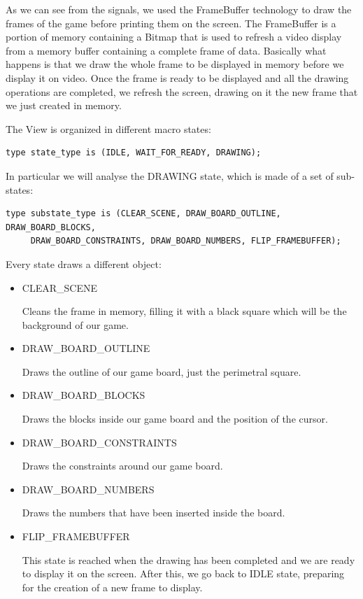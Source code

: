 \documentclass[12pt]{report}
\begin{document}
As we can see from the signals, we used the FrameBuffer technology to draw
the frames of the game before printing them on the screen. The FrameBuffer
is a portion of memory containing a Bitmap that is used to refresh a video
display from a memory buffer containing a complete frame of data.
Basically what happens is that we draw the whole frame to be displayed in
memory before we display it on video. Once the frame is ready to
be displayed and all the drawing operations are completed, we refresh the
screen, drawing on it the new frame that we just created in memory.

\newpage

The View is organized in different macro states:

\begin{verbatim}
type state_type is (IDLE, WAIT_FOR_READY, DRAWING);
\end{verbatim}

In particular we will analyse the DRAWING state, which is made of a set of
sub-states:

\begin{verbatim}
type substate_type is (CLEAR_SCENE, DRAW_BOARD_OUTLINE, DRAW_BOARD_BLOCKS,
     DRAW_BOARD_CONSTRAINTS, DRAW_BOARD_NUMBERS, FLIP_FRAMEBUFFER);
\end{verbatim}

Every state draws a different object:

\begin{itemize}
  \item CLEAR\_SCENE

  Cleans the frame in memory, filling it with a black square which will be
  the background of our game.

  \item DRAW\_BOARD\_OUTLINE

  Draws the outline of our game board, just the perimetral square.

  \item DRAW\_BOARD\_BLOCKS

  Draws the blocks inside our game board and the position of the cursor.

  \item DRAW\_BOARD\_CONSTRAINTS

  Draws the constraints around our game board.

  \item DRAW\_BOARD\_NUMBERS

  Draws the numbers that have been inserted inside the board.

  \item FLIP\_FRAMEBUFFER

  This state is reached when the drawing has been completed and we are
  ready to display it on the screen. After this, we go back to IDLE state,
  preparing for the creation of a new frame to display.
\end{itemize}
\end{document}
